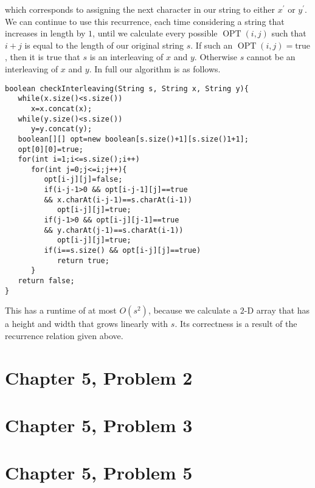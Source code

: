 \documentclass[12pt]{article}
\begin{document}
which corresponds to assigning the next character in our string to either \(x^\prime\) or \(y^\prime\). We can continue to use this recurrence,
each time considering a string that increases in length by \(1\), until we calculate every possible \(\operatorname{OPT}(i,j)\) such that \(i+j\) is
equal to the length of our original string \(s\). If such an \(\operatorname{OPT}(i,j)=\text{true}\), then it is true that \(s\) is an interleaving
of \(x\) and \(y\). Otherwise \(s\) cannot be an interleaving of \(x\) and \(y\). In full our algorithm is as follows.

\begin{verbatim}
boolean checkInterleaving(String s, String x, String y){
   while(x.size()<s.size())
      x=x.concat(x);
   while(y.size()<s.size())
      y=y.concat(y);
   boolean[][] opt=new boolean[s.size()+1][s.size()1+1];
   opt[0][0]=true;
   for(int i=1;i<=s.size();i++)
      for(int j=0;j<=i;j++){
         opt[i-j][j]=false;
         if(i-j-1>0 && opt[i-j-1][j]==true
         && x.charAt(i-j-1)==s.charAt(i-1))
            opt[i-j][j]=true;
         if(j-1>0 && opt[i-j][j-1]==true
         && y.charAt(j-1)==s.charAt(i-1))
            opt[i-j][j]=true;
         if(i==s.size() && opt[i-j][j]==true)
            return true;
      }
   return false;
}
\end{verbatim}
This has a runtime of at most \(O(s^2)\), because we calculate a \(2\)-D array that has a height and width that grows linearly with \(s\). Its correctness
is a result of the recurrence relation given above.

\pagebreak

\section*{Chapter 5, Problem 2}

\pagebreak

\section*{Chapter 5, Problem 3}

\pagebreak

\section*{Chapter 5, Problem 5}

\pagebreak
\end{document}
